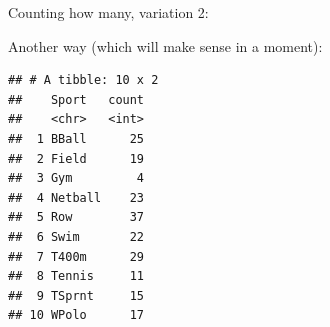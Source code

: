\documentclass[ignorenonframetext,]{beamer}
\newenvironment{Shaded}{\begin{snugshade}}{\end{snugshade}}
\newcommand{\DataTypeTok}[1]{\textcolor[rgb]{0.13,0.29,0.53}{#1}}
\newcommand{\KeywordTok}[1]{\textcolor[rgb]{0.13,0.29,0.53}{\textbf{#1}}}
\newcommand{\NormalTok}[1]{#1}
\newcommand{\OperatorTok}[1]{\textcolor[rgb]{0.81,0.36,0.00}{\textbf{#1}}}
\newcommand{\StringTok}[1]{\textcolor[rgb]{0.31,0.60,0.02}{#1}}
\begin{document}
\begin{frame}[fragile]{Counting how many, variation 2:}
\protect\hypertarget{counting-how-many-variation-2}{}

Another way (which will make sense in a moment):

\small

\begin{Shaded}
\end{Shaded}

\begin{verbatim}
## # A tibble: 10 x 2
##    Sport   count
##    <chr>   <int>
##  1 BBall      25
##  2 Field      19
##  3 Gym         4
##  4 Netball    23
##  5 Row        37
##  6 Swim       22
##  7 T400m      29
##  8 Tennis     11
##  9 TSprnt     15
## 10 WPolo      17
\end{verbatim}

\normalsize

\end{frame}
\end{document}
